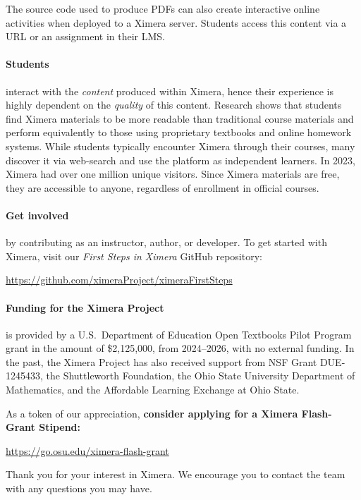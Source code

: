 \documentclass{ximera}
\begin{document}
The source code used to produce PDFs can also create interactive online
activities when deployed to a Ximera server. Students access this content via a
URL or an assignment in their LMS.


\paragraph{Students} interact with the \textit{content} produced within
Ximera, hence their experience is highly dependent on the \textit{quality} of this
content. Research shows that students find Ximera materials to be more readable
than traditional course materials and perform equivalently to those using
proprietary textbooks and online homework systems. While students typically
encounter Ximera through their courses, many discover it via web-search and
use the platform as independent learners. In 2023, Ximera had over one million
unique visitors. Since Ximera materials are free, they are accessible to
anyone, regardless of enrollment in official courses.




\paragraph{Get involved} by contributing as an instructor, author,
or developer. To get started with Ximera, visit our
\textit{First Steps in Ximera} GitHub repository:
\begin{center}
    \url{https://github.com/ximeraProject/ximeraFirstSteps}
\end{center}

\paragraph{Funding for the Ximera Project} is provided by
a U.S.\ Department of Education Open Textbooks Pilot Program grant in the
amount of \$2,125,000, from 2024--2026, with no external funding.
In the past, the Ximera Project has
also received support from NSF Grant DUE-1245433, the Shuttleworth
Foundation, the Ohio State University
Department of Mathematics, and the Affordable Learning Exchange at Ohio State.

As a token of our appreciation, \textbf{consider applying for a Ximera
    Flash-Grant Stipend:}
\begin{center}
    \url{https://go.osu.edu/ximera-flash-grant}
\end{center}
Thank you for your interest in Ximera. We encourage you to contact the
team with any questions you may have.
\end{document}
